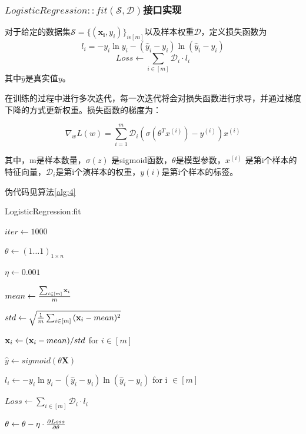 \documentclass{paper}
\begin{document}
\subsubsection{$LogisticRegression::fit(\mathcal{S},\mathcal{D})$接口实现} \label{l:f}

对于给定的数据集$\mathcal{S}=\{(\mathbf{x_i},y_i)\}_{i\epsilon[m]}$以及样本权重$\mathcal{D}$，定义损失函数为
\begin{equation}
    l_i = -y_i\ln{y}_i-(\hat{y}_i-y_i)\ln{(\hat{y}_i-y_i)}
\end{equation}
\begin{equation}
    Loss \leftarrow \sum_{i \in [m]}{\mathcal{D}_i \cdot l_i}
\end{equation}
其中$\hat{y}$是真实值$y$。


在训练的过程中进行多次迭代，每一次迭代将会对损失函数进行求导，并通过梯度下降的方式更新权重。损失函数的梯度为：

\begin{equation}
    \nabla_w L(w) = \sum_{i=1}^m \mathcal{D}_i(\sigma(\theta^Tx^{(i)}) - y^{(i)})x^{(i)}
\end{equation}

其中，m是样本数量，$\sigma(z)$ 是sigmoid函数，$\theta$是模型参数，$x^{(i)}$ 是第i个样本的特征向量，$\mathcal{D}_i$是第i个演样本的权重，$y{(i)}$是第i个样本的标签。

伪代码见算法\ref{alg:4}

\begin{algorithm}[H]
    \SetAlgoLined
    \label{alg:4}
    \caption{LogisticRegression:fit}

    $iter \leftarrow 1000$ 
    
    $\theta \leftarrow (1 \dots 1)_{1 \times n}$ 

    $\eta \leftarrow 0.001$ 

    $mean \leftarrow {\sum_{i \in [m]}{\mathbf{x}_i} \over m}$ 

    $std \leftarrow \sqrt{{1 \over m} \sum_{i \in [m]}{(\mathbf{x}_i - mean)^2}}$ 

    $\mathbf{x}_i \leftarrow {(\mathbf{x}_i-mean) \large/ std}$ for $i \in [m]$ 

    {
        $\hat{y} \leftarrow sigmoid(\theta \mathbf{X})$

        $l_i \leftarrow -y_i\ln{y}_i-(\hat{y}_i-y_i)\ln{(\hat{y}_i-y_i)}$ for i $\in [m]$

        $Loss \leftarrow \sum_{i \in [m]}{\mathcal{D}_i \cdot l_i}$ 
        
        $\theta \leftarrow \theta - \eta \cdot {\partial{Loss} \over \partial{\theta}}$
    }


\end{algorithm}
\end{document}
